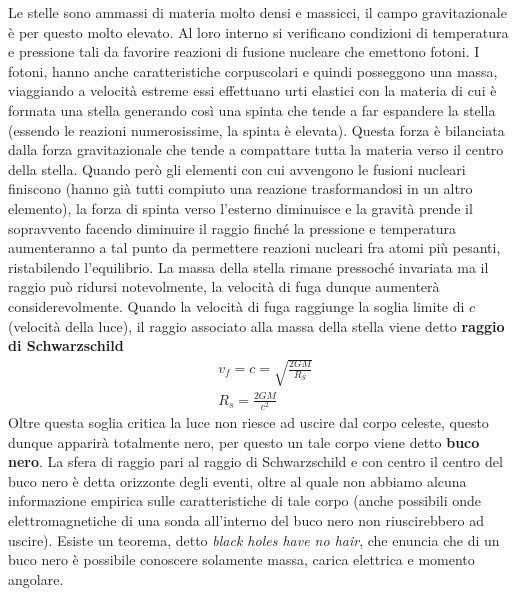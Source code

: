 Le stelle sono ammassi di materia molto densi e massicci, il campo gravitazionale è per questo molto elevato. Al loro interno si verificano condizioni di temperatura e pressione tali da favorire reazioni di fusione nucleare che emettono fotoni. I fotoni, hanno anche caratteristiche corpuscolari e quindi posseggono una massa, viaggiando a velocità estreme essi effettuano urti elastici con la materia di cui è formata una stella generando così una spinta che tende a far espandere la stella (essendo le reazioni numerosissime, la spinta è elevata). Questa forza è bilanciata dalla forza gravitazionale che tende a compattare tutta la materia verso il centro della stella. Quando però gli elementi con cui avvengono le fusioni nucleari finiscono (hanno già tutti compiuto una reazione trasformandosi in un altro elemento), la forza di spinta verso l'esterno diminuisce e la gravità prende il sopravvento facendo diminuire il raggio finché la pressione e temperatura aumenteranno a tal punto da permettere reazioni nucleari fra atomi più pesanti, ristabilendo l'equilibrio. La massa della stella rimane pressoché invariata ma il raggio può ridursi notevolmente, la velocità di fuga dunque aumenterà considerevolmente. Quando la velocità di fuga raggiunge la soglia limite di $c$ (velocità della luce), il raggio associato alla massa della stella viene detto \textbf{raggio di Schwarzschild}
\begin{align*}
	&v_f = c = \sqrt{\frac{2GM}{R_S}}\\
	&R_s = \frac{2GM}{c^2}
\end{align*}
Oltre questa soglia critica la luce non riesce ad uscire dal corpo celeste, questo dunque apparirà totalmente nero, per questo un tale corpo viene detto \textbf{buco nero}. La sfera di raggio pari al raggio di Schwarzschild e con centro il centro del buco nero è detta orizzonte degli eventi, oltre al quale non abbiamo alcuna informazione empirica sulle caratteristiche di tale corpo (anche possibili onde elettromagnetiche di una sonda all'interno del buco nero non riuscirebbero ad uscire). Esiste un teorema, detto \textit{black holes have no hair}, che enuncia che di un buco nero è possibile conoscere solamente massa, carica elettrica e momento angolare. 

